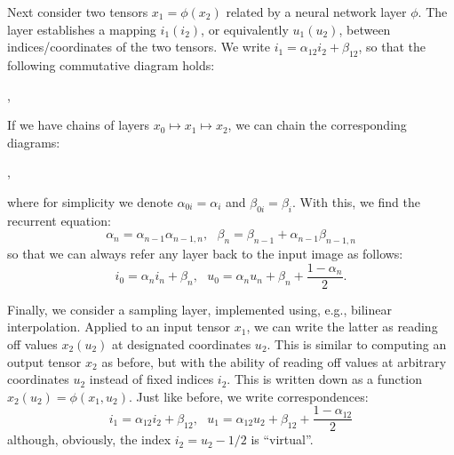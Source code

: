 Next consider two tensors $x_1 = \phi(x_2)$ related by a neural network layer $\phi$.
The layer establishes a mapping $i_1(i_2)$, or equivalently $u_1(u_2)$, between indices/coordinates of the two tensors.
We write $i_1 = \alpha_{12} i_2 + \beta_{12}$, so that the following commutative diagram holds:
\begin{center}
,
\end{center}
If we have chains of layers $x_0 \mapsto x_1 \mapsto x_2$, we can chain the corresponding diagrams:
\begin{center}
,
\end{center}
where for simplicity we denote $\alpha_{0i} = \alpha_i$ and $\beta_{0i} = \beta_i$.
With this, we find the recurrent equation:
$$
\boxed{
\alpha_n = \alpha_{n-1} \alpha_{n-1,n},
~~~
\beta_n = \beta_{n-1} + \alpha_{n-1} \beta_{n-1,n}
}
$$
so that we can always refer any layer back to the input image as follows:
$$
i_0 = \alpha_n i_n + \beta_n,~~~
u_0 = \alpha_n u_n + \beta_n + \frac{1-\alpha_{n}}{2}.
$$

Finally, we consider a sampling layer, implemented using, e.g., bilinear interpolation.
Applied to an input tensor $x_1$, we can write the latter as reading off values $x_2(u_2)$ at designated coordinates $u_2$.
This is similar to computing an output tensor $x_2$ as before, but with the ability of reading off values at arbitrary coordinates $u_2$ instead of fixed indices $i_2$.
This is written down as a function
$
x_2(u_2) =\phi(x_1, u_2).
$
Just like before, we write correspondences:
$$
i_1 = \alpha_{12} i_2 + \beta_{12},~~~
u_1 = \alpha_{12} u_2 + \beta_{12} + \frac{1-\alpha_{12}}{2}
$$
although, obviously, the index $i_2 = u_2 - 1/2$ is ``virtual''.


